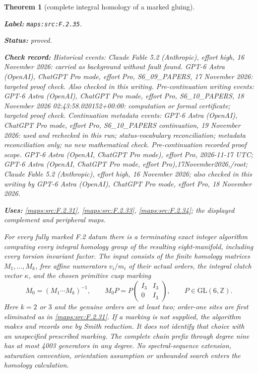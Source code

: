 \documentclass[11pt,a4paper]{article}
\newtheorem{theorem}{Theorem}[section]
\theoremstyle{definition}
\newcommand{\StatementRecord}[4]{\par\smallskip\begingroup\upshape\raggedright\noindent\textbf{Label:} \nolinkurl{#1}.\par\noindent\textbf{Status:} #2.\par\noindent\textbf{Check record:} #3.\par\noindent\textbf{Uses:} #4.\par\endgroup\smallskip}
\begin{document}
\begin{theorem}[complete integral homology of a marked gluing]\label{maps:src:F.2.35}
\StatementRecord{maps:src:F.2.35}{proved}{Historical events: Claude Fable 5.2 (Anthropic), effort high, 16 November 2026: carried as background without fault found. GPT-6 Astra (OpenAI), ChatGPT Pro mode, effort Pro, S6\_09\_PAPERS, 17 November 2026: targeted proof check. Also checked in this writing. Pre-continuation writing events: GPT-6 Astra (OpenAI), ChatGPT Pro mode, effort Pro, S6\_10\_PAPERS, 18 November 2026 02:43:58.020152+00:00: computation or formal certificate; targeted proof check. Continuation metadata events: GPT-6 Astra (OpenAI), ChatGPT Pro mode, effort Pro, S6\_10\_PAPERS continuation, 19 November 2026: used and rechecked in this run; status-vocabulary reconciliation; metadata reconciliation only; no new mathematical check. \emph{Pre-continuation recorded proof scope.} GPT-6 Astra (OpenAI, ChatGPT Pro mode), effort Pro, 2026-11-17 UTC; GPT-6 Astra (OpenAI, ChatGPT Pro mode, effort Pro),17November2026,/root; Claude Fable 5.2 (Anthropic), effort high, 16 November 2026; also checked in this writing by GPT-6 Astra (OpenAI), ChatGPT Pro mode, effort Pro, 18 November 2026}{\cref{maps:src:F.2.31}, \cref{maps:src:F.2.33}, \cref{maps:src:F.2.34}; the displayed complement and peripheral maps}


For every fully marked F.2 datum there is a terminating exact
integer algorithm computing every integral homology group of
the resulting eight-manifold, including every torsion invariant
factor.  The input consists of the finite homology matrices
$M_1,\ldots,M_k$, free affine numerators $v_i/m_i$ of their
actual orders, the integral clutch vector $\kappa$, and the
chosen primitive cusp marking
\[
 M_0=(M_1\cdots M_k)^{-1},\qquad
 M_0P=P\begin{pmatrix}I_3&I_3\\0&I_3\end{pmatrix},
 \qquad P\in\mathrm{GL}(6,\mathbb Z).                       \tag{F.GC1}\label{maps:eq:F.GC1}
\]
Here $k=2$ or $3$ and the genuine orders are at least two;
order-one sites are first eliminated as in \ref{maps:src:F.2.31}.
If a marking is not supplied, the algorithm makes and records
one by Smith reduction.  It does not identify that choice
with an unspecified prescribed marking.
The complete chain prefix through degree nine has at most
4003 generators in any degree.  No spectral-sequence
extension, saturation convention, orientation assumption or
unbounded search enters the homology calculation.

\end{theorem}
\end{document}
